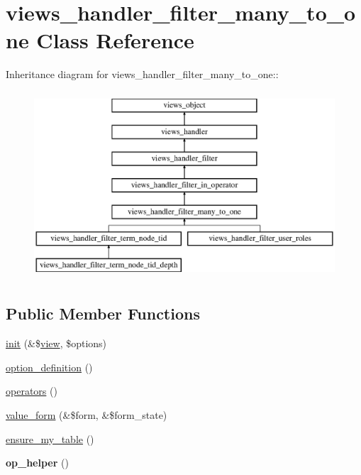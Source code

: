 \hypertarget{classviews__handler__filter__many__to__one}{
\section{views\_\-handler\_\-filter\_\-many\_\-to\_\-one Class Reference}
\label{classviews__handler__filter__many__to__one}
}
Inheritance diagram for views\_\-handler\_\-filter\_\-many\_\-to\_\-one::\begin{figure}[H]
\begin{center}
\leavevmode
\includegraphics[height=7cm]{classviews__handler__filter__many__to__one}
\end{center}
\end{figure}
\subsection*{Public Member Functions}
\begin{CompactItemize}
\item 
\hyperlink{classviews__handler__filter__many__to__one_8417192dd11eaf273b05cbbc47990cbe}{init} (\&\$\hyperlink{classview}{view}, \$options)
\item 
\hyperlink{classviews__handler__filter__many__to__one_e72e4f1ca6a64f22737671275d8d7a92}{option\_\-definition} ()
\item 
\hyperlink{classviews__handler__filter__many__to__one_e397d071d9f55b4053b88f01572e700f}{operators} ()
\item 
\hyperlink{classviews__handler__filter__many__to__one_6c5e3bbabc2ed73418f835195c10f451}{value\_\-form} (\&\$form, \&\$form\_\-state)
\item 
\hyperlink{classviews__handler__filter__many__to__one_6ab5d3416cca7a6f5e59584071758673}{ensure\_\-my\_\-table} ()
\item 
\hypertarget{classviews__handler__filter__many__to__one_f618d87468cd54769de0048630cc9b7e}{
\textbf{op\_\-helper} ()}
\label{classviews__handler__filter__many__to__one_f618d87468cd54769de0048630cc9b7e}

\end{CompactItemize}
